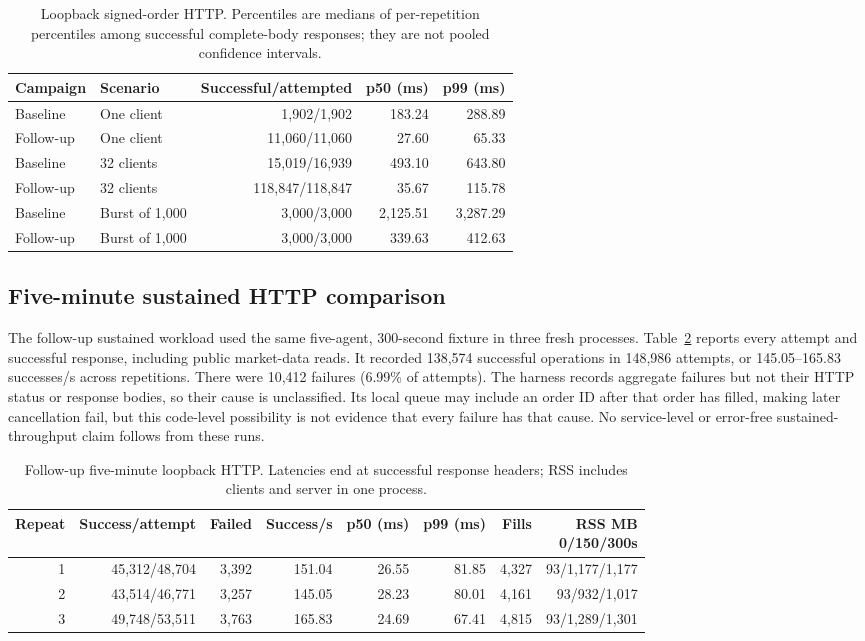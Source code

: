 \documentclass[envcountsame,runningheads,notitlepage]{llncs}
\begin{document}
\begin{table}[h]
\centering\small
\begin{tabular*}{\linewidth}{@{\extracolsep{\fill}}llrrr}
\toprule
Campaign & Scenario & Successful/attempted & p50 (ms) & p99 (ms) \\
\midrule
Baseline & One client & 1,902/1,902 & 183.24 & 288.89 \\
Follow-up & One client & 11,060/11,060 & 27.60 & 65.33 \\
Baseline & 32 clients & 15,019/16,939 & 493.10 & 643.80 \\
Follow-up & 32 clients & 118,847/118,847 & 35.67 & 115.78 \\
Baseline & Burst of 1,000 & 3,000/3,000 & 2,125.51 & 3,287.29 \\
Follow-up & Burst of 1,000 & 3,000/3,000 & 339.63 & 412.63 \\
\bottomrule
\end{tabular*}
\caption{Loopback signed-order HTTP. Percentiles are medians of per-repetition percentiles among successful complete-body responses; they are not pooled confidence intervals.}\label{tab:followup-http}
\end{table}

\subsection{Five-minute sustained HTTP comparison}
The follow-up sustained workload used the same five-agent, 300-second fixture in three fresh processes. Table~\ref{tab:followup-sustained} reports every attempt and successful response, including public market-data reads. It recorded 138,574 successful operations in 148,986 attempts, or 145.05--165.83 successes/s across repetitions. There were 10,412 failures (6.99\% of attempts). The harness records aggregate failures but not their HTTP status or response bodies, so their cause is unclassified. Its local queue may include an order ID after that order has filled, making later cancellation fail, but this code-level possibility is not evidence that every failure has that cause. No service-level or error-free sustained-throughput claim follows from these runs.\cite{rebenchdata}

\begin{table}[h]
\centering\small
\begin{tabular*}{\linewidth}{@{\extracolsep{\fill}}rrrrrrrr}
\toprule
Repeat & Success/attempt & Failed & Success/s & p50 (ms) & p99 (ms) & Fills & \shortstack{RSS MB\\0/150/300s} \\
\midrule
1 & 45,312/48,704 & 3,392 & 151.04 & 26.55 & 81.85 & 4,327 & 93/1,177/1,177 \\
2 & 43,514/46,771 & 3,257 & 145.05 & 28.23 & 80.01 & 4,161 & 93/932/1,017 \\
3 & 49,748/53,511 & 3,763 & 165.83 & 24.69 & 67.41 & 4,815 & 93/1,289/1,301 \\
\bottomrule
\end{tabular*}
\caption{Follow-up five-minute loopback HTTP. Latencies end at successful response headers; RSS includes clients and server in one process.}\label{tab:followup-sustained}
\end{table}
\end{document}
